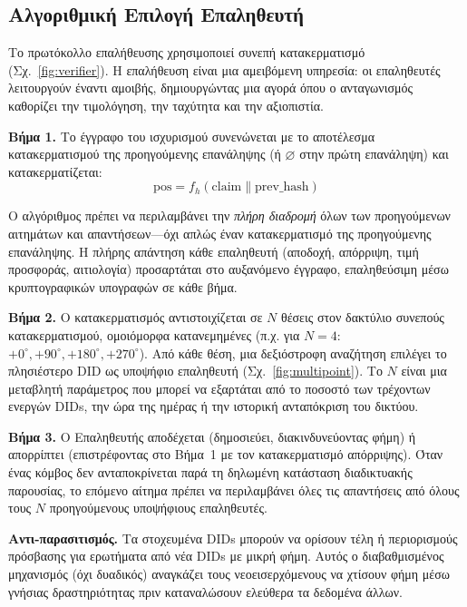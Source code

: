 \documentclass[11pt,a4paper,twocolumn]{article}
\begin{document}
\subsection{Αλγοριθμική Επιλογή Επαληθευτή}

Το πρωτόκολλο επαλήθευσης χρησιμοποιεί συνεπή κατακερματισμό~\cite{karger1997} (Σχ.~\ref{fig:verifier}). Η επαλήθευση είναι μια αμειβόμενη υπηρεσία: οι επαληθευτές λειτουργούν έναντι αμοιβής, δημιουργώντας μια αγορά όπου ο ανταγωνισμός καθορίζει την τιμολόγηση, την ταχύτητα και την αξιοπιστία.

\textbf{Βήμα 1.} Το έγγραφο του ισχυρισμού συνενώνεται με το αποτέλεσμα κατακερματισμού της προηγούμενης επανάληψης (ή $\varnothing$ στην πρώτη επανάληψη) και κατακερματίζεται:
\begin{equation}
\text{pos} = f_h(\text{claim} \| \text{prev\_hash})
\label{eq:hash}
\end{equation}

Ο αλγόριθμος πρέπει να περιλαμβάνει την \emph{πλήρη διαδρομή} όλων των προηγούμενων αιτημάτων και απαντήσεων---όχι απλώς έναν κατακερματισμό της προηγούμενης επανάληψης. Η πλήρης απάντηση κάθε επαληθευτή (αποδοχή, απόρριψη, τιμή προσφοράς, αιτιολογία) προσαρτάται στο αυξανόμενο έγγραφο, επαληθεύσιμη μέσω κρυπτογραφικών υπογραφών σε κάθε βήμα.

\textbf{Βήμα 2.} Ο κατακερματισμός αντιστοιχίζεται σε $N$ θέσεις στον δακτύλιο συνεπούς κατακερματισμού, ομοιόμορφα κατανεμημένες (π.χ. για $N=4$: $+0^{\circ}, +90^{\circ}, +180^{\circ}, +270^{\circ}$). Από κάθε θέση, μια δεξιόστροφη αναζήτηση επιλέγει το πλησιέστερο DID ως υποψήφιο επαληθευτή (Σχ.~\ref{fig:multipoint}). Το $N$ είναι μια μεταβλητή παράμετρος που μπορεί να εξαρτάται από το ποσοστό των τρέχοντων ενεργών DIDs, την ώρα της ημέρας ή την ιστορική ανταπόκριση του δικτύου.

\textbf{Βήμα 3.} Ο Επαληθευτής αποδέχεται (δημοσιεύει, διακινδυνεύοντας φήμη) ή απορρίπτει (επιστρέφοντας στο Βήμα~1 με τον κατακερματισμό απόρριψης). Όταν ένας κόμβος δεν ανταποκρίνεται παρά τη δηλωμένη κατάσταση διαδικτυακής παρουσίας, το επόμενο αίτημα πρέπει να περιλαμβάνει όλες τις απαντήσεις από όλους τους $N$ προηγούμενους υποψήφιους επαληθευτές.

\textbf{Αντι-παρασιτισμός.} Τα στοχευμένα DIDs μπορούν να ορίσουν τέλη ή περιορισμούς πρόσβασης για ερωτήματα από νέα DIDs με μικρή φήμη. Αυτός ο διαβαθμισμένος μηχανισμός (όχι δυαδικός) αναγκάζει τους νεοεισερχόμενους να χτίσουν φήμη μέσω γνήσιας δραστηριότητας πριν καταναλώσουν ελεύθερα τα δεδομένα άλλων.
\end{document}
